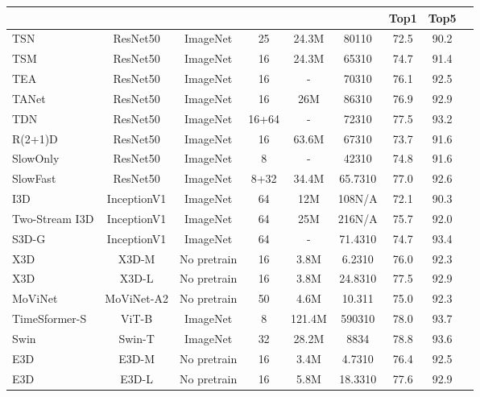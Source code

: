 \documentclass{article} \usepackage{iclr2023_conference,times}
\begin{document}
\begin{table}[]
{\begin{tabular}{l c c  c  c  c  c  c c}
        \multicolumn{1}{c}{} &
        \multicolumn{1}{c}{} &
        \multicolumn{1}{c}{} &
        \multicolumn{1}{c}{} &
        \multicolumn{1}{c}{} &
        \multicolumn{1}{c}{} &
        \multicolumn{1}{c}{Top1}   & 
        \multicolumn{1}{c}{Top5}    \\ 
\midrule[1pt]
TSN \citep{wang2016tsn} & ResNet50 & ImageNet & 25  & 24.3M & 80110 & 72.5 & 90.2  \\
TSM \citep{lin2019tsm} & ResNet50 & ImageNet & 16  & 24.3M & 65310 & 74.7 & 91.4  \\
TEA \citep{li2020tea}& ResNet50 & ImageNet & 16  & - & 70310 & 76.1 & 92.5  \\
TANet \citep{liu2021tam} & ResNet50 & ImageNet & 16  & 26M & 86310 & 76.9 & 92.9  \\
        TDN \citep{wang2021tdn} & ResNet50 & ImageNet & 16+64  & - & 72310 & 77.5 & 93.2  \\
R(2+1)D \citep{tran2018R21d} & ResNet50 & ImageNet & 16  & 63.6M & 67310 & 73.7 & 91.6  \\
SlowOnly \citep{feichtenhofer2019slowfast} & ResNet50 & ImageNet & 8  & - & 42310 & 74.8 & 91.6\\
        SlowFast \citep{feichtenhofer2019slowfast} & ResNet50 & ImageNet & 8+32  & 34.4M & 65.7310 & 77.0 & 92.6\\
\midrule[1pt]
        I3D \citep{carreira2017i3d} & InceptionV1 & ImageNet & 64  & 12M & 108N/A & 72.1 & 90.3  \\ 
        Two-Stream I3D \citep{carreira2017i3d} & InceptionV1 & ImageNet & 64  & 25M & 216N/A & 75.7 & 92.0  \\
S3D-G \citep{xie2018s3d} & InceptionV1 & ImageNet & 64  & - & 71.4310 & 74.7 & 93.4  \\ 
        X3D \citep{feichtenhofer2020x3d} & X3D-M & No pretrain & 16  & 3.8M & 6.2310 & 76.0 & 92.3  \\
        X3D \citep{feichtenhofer2020x3d} & X3D-L & No pretrain & 16  & 3.8M & 24.8310 & 77.5 & 92.9  \\
        MoViNet \citep{kondratyuk2021movinets} & MoViNet-A2 & No pretrain & 50 & 4.6M & 10.311 & 75.0 & 92.3 \\
\midrule[1pt]
        TimeSformer-S \citep{bertasius2021timesformer} & ViT-B & ImageNet & 8  & 121.4M & 590310 & 78.0 & 93.7  \\
Swin \citep{liu2022video} & Swin-T & ImageNet & 32 & 28.2M & 8834 & 78.8 & 93.6 \\
        \midrule[1pt]
E3D & E3D-M & No pretrain & 16  & 3.4M & 4.7310 & 76.4 & 92.5 \\
        E3D & E3D-L & No pretrain & 16  & 5.8M & 18.3310 & 77.6 & 92.9 \\
        \bottomrule[1pt]
        \end{tabular}
        }
        \label{tb:k400}
\end{table}
\end{document}

